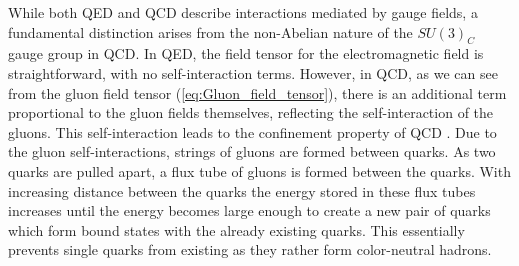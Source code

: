 
While both QED and QCD describe interactions mediated by gauge fields, a fundamental distinction arises from the non-Abelian nature of the $SU(3)_C$ gauge group in QCD. In QED, the field tensor for the electromagnetic field is straightforward, with no self-interaction terms. However, in QCD, as we can see from the gluon field tensor (\ref{eq:Gluon_field_tensor}), there is an additional term proportional to the gluon fields themselves, reflecting the self-interaction of the gluons. This self-interaction leads to the confinement property of QCD \cite{51,52,53}. Due to the gluon self-interactions, strings of gluons are formed between quarks. As two quarks are pulled apart, a flux tube of gluons is formed between the quarks. With increasing distance between the quarks the energy stored in these flux tubes increases until the energy becomes large enough to create a new pair of quarks which form bound states with the already existing quarks. This essentially prevents single quarks from existing as they rather form color-neutral hadrons.

